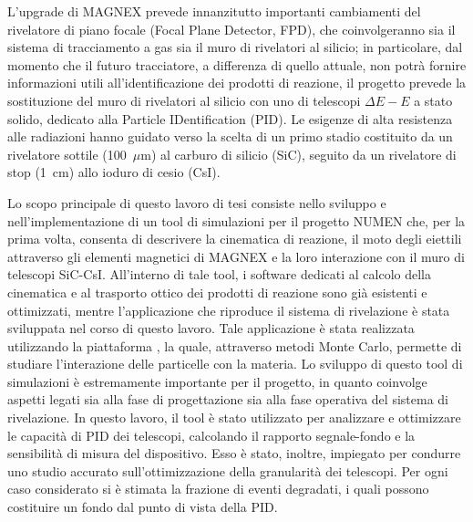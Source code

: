 L'upgrade di MAGNEX prevede innanzitutto importanti cambiamenti del rivelatore di piano focale (Focal Plane Detector, FPD), che coinvolgeranno sia il sistema di tracciamento a gas sia il muro di rivelatori al silicio; in particolare, dal momento che il futuro tracciatore, a differenza di quello attuale, non potrà fornire informazioni utili all'identificazione dei prodotti di reazione, il progetto prevede la sostituzione del muro di rivelatori al silicio con uno di telescopi $\Delta E - E$ a stato solido, dedicato alla Particle IDentification (PID). 
Le esigenze di alta resistenza alle radiazioni hanno guidato verso la scelta di un primo stadio costituito da un rivelatore sottile (100~$\mu$m) al carburo di silicio (SiC), seguito da un rivelatore di stop (1~cm) allo ioduro di cesio (CsI).

Lo scopo principale di questo lavoro di tesi consiste nello sviluppo e nell'implementazione di un tool di simulazioni per il progetto NUMEN che, per la prima volta, consenta di descrivere la cinematica di reazione, il moto degli eiettili attraverso gli elementi magnetici di MAGNEX e la loro interazione con il muro di telescopi SiC-CsI.
All'interno di tale tool, i software dedicati al calcolo della cinematica e al trasporto ottico dei prodotti di reazione sono già esistenti e ottimizzati, mentre l'applicazione che riproduce il sistema di rivelazione è stata sviluppata nel corso di questo lavoro.
Tale applicazione è stata realizzata utilizzando la piattaforma \geant{}, la quale, attraverso metodi Monte Carlo, permette di studiare l'interazione delle particelle con la materia.
Lo sviluppo di questo tool di simulazioni è estremamente importante per il progetto, in quanto coinvolge aspetti legati sia alla fase di progettazione sia alla fase operativa del sistema di rivelazione.
In questo lavoro, il tool è stato utilizzato per analizzare e ottimizzare le capacità di PID dei telescopi, calcolando il rapporto segnale-fondo e la sensibilità di misura del dispositivo.
Esso è stato, inoltre, impiegato per condurre uno studio accurato sull'ottimizzazione della granularità dei telescopi.
Per ogni caso considerato si è stimata la frazione di eventi degradati, i quali possono costituire un fondo dal punto di vista della PID. 
